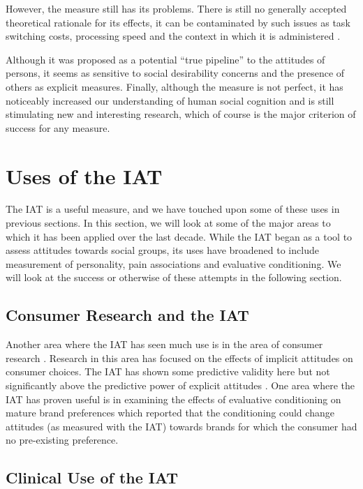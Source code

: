 However, the measure still has its problems. There is still no generally accepted theoretical rationale for its effects, it can be contaminated by such issues as task switching costs\cite{Klauer2005}, processing speed\cite{Blanton2006} and the context in which it is administered \cite{Boysen2006}. 

Although it was proposed as a potential ``true pipeline'' to the attitudes of persons, it seems as sensitive to social desirability concerns and the presence of others as explicit measures. Finally, although the measure is not perfect, it has noticeably increased our understanding of human social cognition and is still stimulating new and interesting research, which of course is the major criterion of success for any measure. 

\section{Uses of the IAT}%
\label{sec:uses-iat}

The IAT is a useful measure, and we have touched upon some of these uses in previous sections. In this section, we will look at some of the major areas to which it has been applied over the last decade. While the IAT began as a tool to assess attitudes towards social groups, its uses have broadened to include measurement of personality, pain associations and evaluative conditioning. We will look at the success or otherwise of these attempts in the following section. 

\subsection{Consumer Research and the IAT}
\label{sec:cons-rese-iat}

Another area where the IAT has seen much use is in the area of consumer research \cite{Lane2007,Maison2001}. Research in this area has focused on the effects of implicit attitudes on consumer choices. The IAT has shown some predictive validity here \cite{Maison2004}  but not significantly above the predictive power of explicit attitudes \cite{Greenwald2009}. One area where the IAT has proven useful is in examining the effects of evaluative conditioning on mature brand preferences \cite{Gibson2008} which reported that the conditioning could change attitudes (as measured with the IAT) towards brands for which the consumer had no pre-existing preference.


\subsection{Clinical Use of the IAT}
\label{sec:clinical-use-iat}

